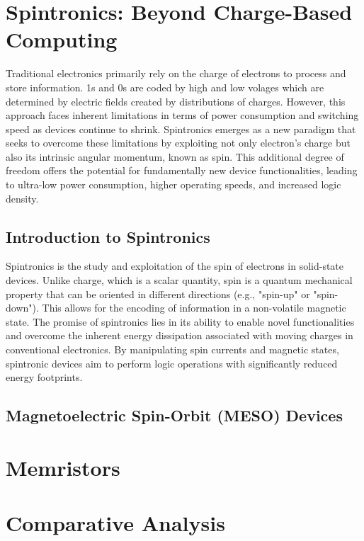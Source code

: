 \documentclass[sigconf,authordraft]{acmart}
\begin{document}
\section{Spintronics: Beyond Charge-Based Computing}
Traditional electronics primarily rely on the charge of electrons 
to process and store information. 1s and 0s are coded by high and 
low volages which are determined by electric fields created by
distributions of charges. However, this approach faces inherent 
limitations in terms of power consumption and switching speed as 
devices continue to shrink. Spintronics emerges as a new paradigm 
that seeks to overcome these limitations by exploiting not only electron's 
charge but also its intrinsic angular momentum, known as spin. 
This additional degree of freedom offers the potential for 
fundamentally new device functionalities, leading to 
ultra-low power consumption, higher operating speeds, and increased 
logic density.

\subsection{Introduction to Spintronics}
Spintronics is the study and exploitation of the spin 
of electrons in solid-state devices. Unlike charge, which is a 
scalar quantity, spin is a quantum mechanical property that can 
be oriented in different directions (e.g., "spin-up" or "spin-down").
This allows for the encoding of information in a non-volatile magnetic
state. The promise of spintronics lies in its ability to enable 
novel functionalities and overcome the inherent energy dissipation 
associated with moving charges in conventional electronics. By manipulating 
spin currents and magnetic states, spintronic devices aim to perform logic 
operations with significantly reduced energy footprints.

\subsection{Magnetoelectric Spin-Orbit (MESO) Devices} 

\section{Memristors}

\section{Comparative Analysis}
\end{document}
